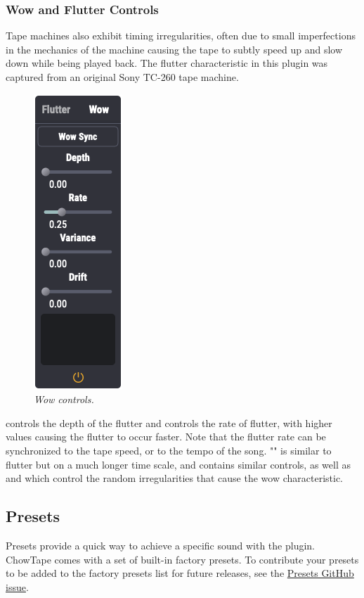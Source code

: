 \documentclass[landscape,twocolumn,a5paper]{manual}
\begin{document}
\subsubsection{Wow and Flutter Controls}
Tape machines also exhibit timing irregularities, often due
to small imperfections in the mechanics of the machine causing
the tape to subtly speed up and slow down while being
played back. The flutter characteristic in this plugin was
captured from an original Sony TC-260 tape machine.
\newpar
%
\begin{figure}[ht]
    \center
    \includegraphics[height=0.32\paperheight]{../Plugin/Screenshots/Wow.png}
    \caption{\label{wow_controls}{\it Wow controls.}}
\end{figure}
%
 controls the depth of the flutter and
 controls the rate of flutter, with higher values
causing the flutter to occur faster. Note that the
flutter rate can be synchronized to the tape speed, or to the
tempo of the song.
\newpar
"" is similar to flutter but on a much longer time scale,
and contains similar controls, as well as  and
 which control the random irregularities that
cause the wow characteristic.

\subsection{Presets}
Presets provide a quick way to achieve a specific sound
with the plugin. ChowTape comes with a set of built-in
factory presets. To contribute your presets to be added
to the factory presets list for future releases, see the
\href{https://github.com/jatinchowdhury18/AnalogTapeModel/issues/30}{Presets GitHub issue}.
\end{document}
